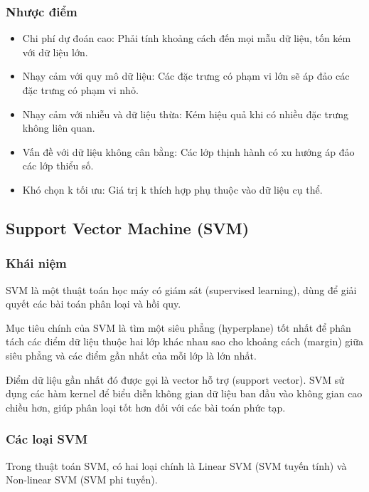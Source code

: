 \documentclass[
]{article}
\providecommand{\tightlist}{%
  \setlength{\itemsep}{0pt}\setlength{\parskip}{0pt}}
\begin{document}
\subsubsection{Nhược điểm}\label{nhux1b0ux1ee3c-ux111iux1ec3m}

\begin{itemize}
\tightlist
\item
  Chi phí dự đoán cao: Phải tính khoảng cách đến mọi mẫu dữ liệu, tốn
  kém với dữ liệu lớn.
\item
  Nhạy cảm với quy mô dữ liệu: Các đặc trưng có phạm vi lớn sẽ áp đảo
  các đặc trưng có phạm vi nhỏ.
\item
  Nhạy cảm với nhiễu và dữ liệu thừa: Kém hiệu quả khi có nhiều đặc
  trưng không liên quan.
\item
  Vấn đề với dữ liệu không cân bằng: Các lớp thịnh hành có xu hướng áp
  đảo các lớp thiểu số.
\item
  Khó chọn k tối ưu: Giá trị k thích hợp phụ thuộc vào dữ liệu cụ thể.
\end{itemize}

\subsection{Support Vector Machine
(SVM)}\label{support-vector-machine-svm}

\subsubsection{Khái niệm}\label{khuxe1i-niux1ec7m-2}

SVM là một thuật toán học máy có giám sát (supervised learning), dùng để
giải quyết các bài toán phân loại và hồi quy.

Mục tiêu chính của SVM là tìm một siêu phẳng (hyperplane) tốt nhất để
phân tách các điểm dữ liệu thuộc hai lớp khác nhau sao cho khoảng cách
(margin) giữa siêu phẳng và các điểm gần nhất của mỗi lớp là lớn nhất.

Điểm dữ liệu gần nhất đó được gọi là vector hỗ trợ (support vector). SVM
sử dụng các hàm kernel để biểu diễn không gian dữ liệu ban đầu vào không
gian cao chiều hơn, giúp phân loại tốt hơn đối với các bài toán phức
tạp.

\subsubsection{Các loại SVM}\label{cuxe1c-loux1ea1i-svm}

Trong thuật toán SVM, có hai loại chính là Linear SVM (SVM tuyến tính)
và Non-linear SVM (SVM phi tuyến).
\end{document}
